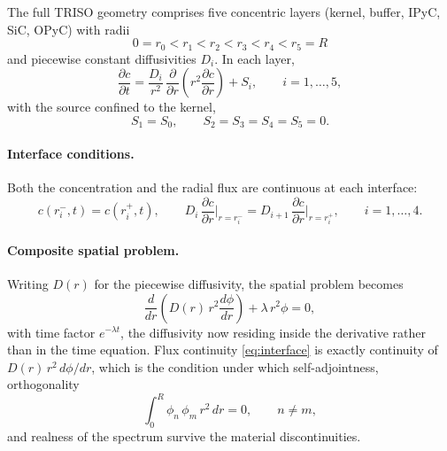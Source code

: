 \documentclass[11pt,a4paper]{article}
\begin{document}
The full TRISO geometry comprises five concentric layers (kernel, buffer, IPyC, SiC,
OPyC) with radii
\begin{equation}
0 = r_{0} < r_{1} < r_{2} < r_{3} < r_{4} < r_{5} = R
\end{equation}
and piecewise constant diffusivities $D_{i}$. In each layer,
\begin{equation}
\frac{\partial c}{\partial t}
= \frac{D_{i}}{r^{2}}\,\frac{\partial}{\partial r}\!\left(r^{2}\frac{\partial c}{\partial r}\right)
+ S_{i} ,
\qquad i = 1,\dots,5 ,
\end{equation}
with the source confined to the kernel,
\begin{equation}
S_{1} = S_{0} ,
\qquad
S_{2} = S_{3} = S_{4} = S_{5} = 0 .
\end{equation}

\paragraph{Interface conditions.}
Both the concentration and the radial flux are continuous at each interface:
\begin{equation}
c\!\left(r_{i}^{-},t\right) = c\!\left(r_{i}^{+},t\right) ,
\qquad
D_{i}\,\frac{\partial c}{\partial r}\bigg|_{r = r_{i}^{-}}
= D_{i+1}\,\frac{\partial c}{\partial r}\bigg|_{r = r_{i}^{+}} ,
\qquad i = 1,\dots,4 .
\label{eq:interface}
\end{equation}

\paragraph{Composite spatial problem.}
Writing $D(r)$ for the piecewise diffusivity, the spatial problem becomes
\begin{equation}
\frac{d}{dr}\!\left(D(r)\, r^{2}\frac{d\phi}{dr}\right) + \lambda\, r^{2}\phi = 0 ,
\end{equation}
with time factor $e^{-\lambda t}$, the diffusivity now residing inside the
derivative rather than in the time equation. Flux continuity \eqref{eq:interface} is
exactly continuity of $D(r)\,r^{2}\,d\phi/dr$, which is the condition under which
self-adjointness, orthogonality
\begin{equation}
\int_{0}^{R} \phi_{n}\,\phi_{m}\, r^{2}\,dr = 0 ,
\qquad n \neq m ,
\end{equation}
and realness of the spectrum survive the material discontinuities.
\end{document}
